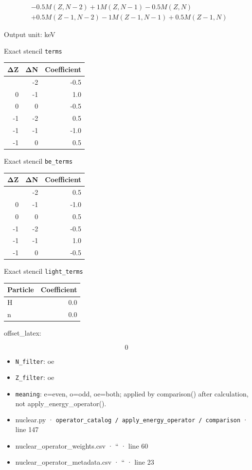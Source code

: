 \documentclass[
  11pt,
  letterpaper,
]{article}
\begin{document}
\[
\begin{aligned}
& -0.5M(Z,N-2)+1M(Z,N-1)-0.5M(Z,N) \\
& +0.5M(Z-1,N-2)-1M(Z-1,N-1)+0.5M(Z-1,N)
\end{aligned}
\]

Output unit: keV

Exact stencil \texttt{terms}

\begin{longtable}[]{@{}rrr@{}}
\toprule\noalign{}
ΔZ & ΔN & Coefficient \\
\midrule\noalign{}
\endhead
\bottomrule\noalign{}
\endlastfoot
0 & -2 & -0.5 \\
0 & -1 & 1.0 \\
0 & 0 & -0.5 \\
-1 & -2 & 0.5 \\
-1 & -1 & -1.0 \\
-1 & 0 & 0.5 \\
\end{longtable}

Exact stencil \texttt{be\_terms}

\begin{longtable}[]{@{}rrr@{}}
\toprule\noalign{}
ΔZ & ΔN & Coefficient \\
\midrule\noalign{}
\endhead
\bottomrule\noalign{}
\endlastfoot
0 & -2 & 0.5 \\
0 & -1 & -1.0 \\
0 & 0 & 0.5 \\
-1 & -2 & -0.5 \\
-1 & -1 & 1.0 \\
-1 & 0 & -0.5 \\
\end{longtable}

Exact stencil \texttt{light\_terms}

\begin{longtable}[]{@{}lr@{}}
\toprule\noalign{}
Particle & Coefficient \\
\midrule\noalign{}
\endhead
\bottomrule\noalign{}
\endlastfoot
H & 0.0 \\
n & 0.0 \\
\end{longtable}

offset\_latex:

\[
0
\]

\begin{itemize}
\item
  \texttt{N\_filter}: oe
\item
  \texttt{Z\_filter}: oe
\item
  \texttt{meaning}: e=even, o=odd, oe=both; applied by comparison()
  after calculation, not apply\_energy\_operator().
\item
  nuclear.py ·
  \texttt{operator\_catalog\ /\ apply\_energy\_operator\ /\ comparison}
  · line 147
\item
  nuclear\_operator\_weights.csv · `` · line 60
\item
  nuclear\_operator\_metadata.csv · `` · line 23
\end{itemize}
\end{document}
